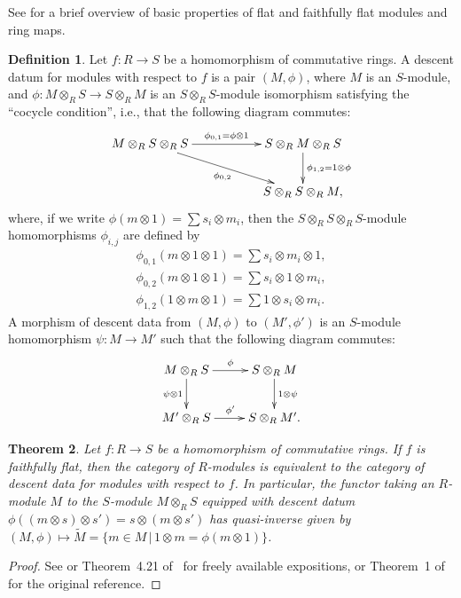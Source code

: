\documentclass[pdftex]{sigma}
\newtheorem{thm}{Theorem}[section]
\theoremstyle{definition}
\newtheorem{defn}[thm]{Definition}
\begin{document}
See \cite[\href{https://stacks.math.columbia.edu/tag/00H9}{Section~00H9}]{Stacks} for a brief overview of basic properties of flat and faithfully flat modules and ring maps.

\begin{defn} \label{defn:descent-datum-for-modules}
Let $f\colon R \to S$ be a homomorphism of commutative rings. A descent datum for modules with respect to $f$ is a pair $(M, \phi)$, where $M$ is an $S$-module, and $\phi\colon M \otimes_{R} S \to S \otimes_{R} M$ is an $S \otimes_{R} S$-module isomorphism satisfying the ``cocycle condition'', i.e., that the following diagram commutes:
\begin{gather*} \xymatrix{ M \otimes_{R} S \otimes_{R} S \ar[rr]^{\phi_{0,1} = \phi \otimes 1} \ar[rrd]_{\phi_{0,2}} & & S \otimes_{R} M \otimes_{R} S \ar[d]^{\phi_{1,2} = 1 \otimes \phi} \\ & & S \otimes_{R} S \otimes_{R} M,} \end{gather*}
where, if we write $\phi(m \otimes 1) = \sum s_i \otimes m_i$, then the $S \otimes_{R} S \otimes_{R} S$-module homomorphisms $\phi_{i,j}$ are defined by
\begin{gather*}
\phi_{0,1}(m \otimes 1 \otimes 1) = \sum s_i \otimes m_i \otimes 1, \\
\phi_{0,2}(m \otimes 1 \otimes 1) = \sum s_i \otimes 1 \otimes m_i, \\
\phi_{1,2}(1 \otimes m \otimes 1) = \sum 1 \otimes s_i \otimes m_i.
\end{gather*}
A morphism of descent data from $(M, \phi)$ to $(M', \phi')$ is an $S$-module homomorphism $\psi\colon M \to M'$ such that the following diagram commutes:
\begin{gather*} \xymatrix{ M \otimes_{R} S \ar[r]^{\phi} \ar[d]_{\psi \otimes 1} & S \otimes_{R} M \ar[d]^{1 \otimes \psi} \\
M' \otimes_{R} S \ar[r]^{\phi'} & S \otimes_{R} M'. } \end{gather*}
\end{defn}

\begin{thm} \label{thm:descent-for-modules}
Let $f\colon R \to S$ be a homomorphism of commutative rings. If $f$ is faithfully flat, then the category of $R$-modules is equivalent to the category of descent data for modules with respect to $f$. In particular, the functor taking an $R$-module $M$ to the $S$-module $M \otimes_{R} S$ equipped with descent datum $\phi((m \otimes s) \otimes s') = s \otimes (m \otimes s')$ has quasi-inverse given by $(M, \phi) \mapsto \tilde{M} = \{m\in M \,|\, 1 \otimes m = \phi(m \otimes 1)\}$.
\end{thm}
\begin{proof}
See \cite[\href{https://stacks.math.columbia.edu/tag/023N}{Proposition 023N}]{Stacks} or Theorem~4.21 of~\cite{V05} for freely available expositions, or Theorem~1 of~\cite{G59} for the original reference.
\end{proof}
\end{document}
